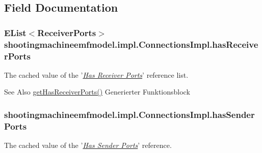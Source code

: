 \subsection{Field Documentation}
\hypertarget{classshootingmachineemfmodel_1_1impl_1_1_connections_impl_ab6f6e2590e9cc8a0476d968c5dd76823}{
\subsubsection[{has\-Receiver\-Ports}]{\setlength{\rightskip}{0pt plus 5cm}E\-List$<${\bf Receiver\-Ports}$>$ shootingmachineemfmodel.\-impl.\-Connections\-Impl.\-has\-Receiver\-Ports\hspace{0.3cm}{\ttfamily [protected]}}}\label{classshootingmachineemfmodel_1_1impl_1_1_connections_impl_ab6f6e2590e9cc8a0476d968c5dd76823}
The cached value of the '\hyperlink{classshootingmachineemfmodel_1_1impl_1_1_connections_impl_a103b66052688de23b26b3aab450c0cec}{{\itshape Has Receiver Ports}}' reference list.

\begin{DoxySeeAlso}{See Also}
\hyperlink{classshootingmachineemfmodel_1_1impl_1_1_connections_impl_a103b66052688de23b26b3aab450c0cec}{get\-Has\-Receiver\-Ports()} Generierter Funktionsblock  
\end{DoxySeeAlso}
\hypertarget{classshootingmachineemfmodel_1_1impl_1_1_connections_impl_a6813262fd753acf72690976a352f60cd}{
\subsubsection[{has\-Sender\-Ports}]{ shootingmachineemfmodel.\-impl.\-Connections\-Impl.\-has\-Sender\-Ports\hspace{0.3cm}{\ttfamily [protected]}}}\label{classshootingmachineemfmodel_1_1impl_1_1_connections_impl_a6813262fd753acf72690976a352f60cd}
The cached value of the '\hyperlink{classshootingmachineemfmodel_1_1impl_1_1_connections_impl_ae75288578dc15b4f66454ee96b23ed0b}{{\itshape Has Sender Ports}}' reference.

